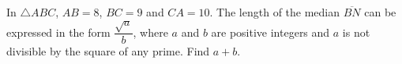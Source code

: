 In $\triangle ABC$, $AB=8$, $BC=9$ and $CA=10$. The length of the median $\overline{BN}$ can be expressed in the form $\dfrac{\sqrt a}{b}$, where $a$ and $b$ are positive integers and $a$ is not divisible by the square of any prime. Find $a+b$.
